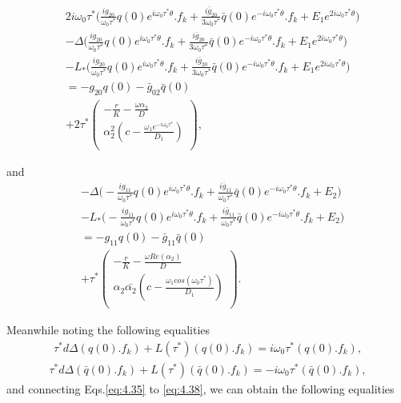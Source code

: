 \documentclass[10pt]{amsart}
\theoremstyle{definition}
\begin{document}
\begin{align}\label{eq:4.35}
&2i\omega_0 \tau^*\Bigg(\frac{ig_{20}}{\omega_0 \tau^*} q(0)e^{i\omega_0 \tau^* \theta}.f_k+\frac{i {\bar g}_{20}}{3\omega_0 \tau^*} \bar q (0)e^{-i\omega_0 \tau^* \theta}.f_k+E_1 e^{2i \omega_0 \tau^* \theta}\Bigg)\nonumber\\
&-\Delta\Bigg(\frac{ig_{20}}{\omega_0 \tau^*} q(0)e^{i\omega_0 \tau^* \theta}.f_k+\frac{i {\bar g}_{20}}{3\omega_0 \tau^*} \bar q (0)e^{-i\omega_0 \tau^* \theta}.f_k+E_1 e^{2i \omega_0 \tau^* \theta}\Bigg)\nonumber\\
&-L_*\Bigg(\frac{ig_{20}}{\omega_0 \tau^*} q(0)e^{i\omega_0 \tau^* \theta}.f_k+\frac{i {\bar g}_{20}}{3\omega_0 \tau^*} \bar q (0)e^{-i\omega_0 \tau^* \theta}.f_k+E_1 e^{2i \omega_0 \tau^* \theta}\Bigg)\\
&=- g_{20} q(0) - \bar{g}_{02} \bar{q} (0)\nonumber\\
&+ 2 \tau^{*}
    \left(
    \begin{array}{c}
  {\displaystyle{-\frac{r}{K}-\frac{\omega \alpha_2}{D}}} \\
  {\displaystyle{\alpha_2^2\left(c-\frac{ \omega_1 e^{-i\omega_0 \tau^*}}{D_1}\right)}}\\
\end{array}
\right),\nonumber
\end{align}

and
\begin{align}\label{eq:4.36}
&-\Delta\Bigg(-\frac{ig_{11}}{\omega_0 \tau^*} q(0)e^{i\omega_0 \tau^* \theta}.f_k+\frac{i {\bar g}_{11}}{\omega_0 \tau^*} \bar q (0)e^{-i\omega_0 \tau^* \theta}.f_k+E_2\Bigg)\nonumber\\
&-L_*\Bigg(-\frac{ig_{11}}{\omega_0 \tau^*} q(0)e^{i\omega_0 \tau^* \theta}.f_k+\frac{i {\bar g}_{11}}{\omega_0 \tau^*} \bar q (0)e^{-i\omega_0 \tau^* \theta}.f_k+E_2\Bigg)\\
& = - g_{11} q(0) - \bar{g}_{11} \bar{q} (0)\nonumber\\
&+  \tau^{*}
   \left(
   \begin{array}{c}
  {\displaystyle{-\frac{r}{K}-\frac{\omega Re(\alpha_2)}{D}}} \\
  {\displaystyle{\alpha_2 \bar{\alpha_2}\left(c-\frac{ \omega_1 cos(\omega_0 \tau^*)}{D_1}\right)}}\\
\end{array}
\right).\nonumber
\end{align}

Meanwhile noting the following equalities\\
\begin{align}\label{eq:4.37}
\tau^*d\Delta(q(0).f_k)+L(\tau^*)(q(0).f_k)=i\omega_0 \tau^*(q(0).f_k),
\end{align}
\begin{align}\label{eq:4.38}
\tau^*d\Delta(\bar q(0).f_k)+L(\tau^*)(\bar q(0).f_k)=-i\omega_0 \tau^*(\bar q(0).f_k),
\end{align}
and connecting Eqs.\eqref{eq:4.35} to \eqref{eq:4.38}, we can obtain the following equalities\\
\end{document}
